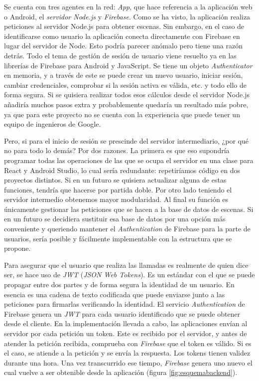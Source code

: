Se cuenta con tres agentes en la red: \textit{App}, que hace referencia a la aplicación web o Android, el \textit{servidor Node.js} y \textit{Firebase}. Como se ha visto, la aplicación realiza peticiones al servidor Node.js para obtener escenas. Sin embargo, en el caso de identificarse como usuario la aplicación conecta directamente con Firebase en lugar del servidor de Node. Esto podría parecer anómalo pero tiene una razón detrás. Todo el tema de gestión de sesión de usuario viene resuelto ya en las librerías de Firebase para Android y JavaScript. Se tiene un objeto \textit{Authenticator} en memoria, y a través de este se puede crear un nuevo usuario, iniciar sesión, cambiar credenciales, comprobar si la sesión activa es válida, etc. y todo ello de forma segura. Si se quisiera realizar todos esos cálculos desde el servidor Node.js añadiría muchos pasos extra y probablemente quedaría un resultado más pobre, ya que para este proyecto no se cuenta con la experiencia que puede tener un equipo de ingenieros de Google.

Pero, si para el inicio de sesión se prescinde del servidor intermediario, ¿por qué no para todo lo demás? Por dos razones. La primera es que eso supondría programar todas las operaciones de las que se ocupa el servidor en una clase para React y Android Studio, lo cual sería redundante: repetiríamos código en dos proyectos distintos. Si en un futuro se quisiera actualizar alguna de estas funciones, tendría que hacerse por partida doble. Por otro lado teniendo el servidor intermedio obtenemos mayor modularidad. Al final su función es únicamente gestionar las peticiones que se hacen a la base de datos de escenas. Si en un futuro se decidiera sustituir esa base de datos por una opción más conveniente y queriendo mantener el \textit{Authentication} de Firebase para la parte de usuarios, sería posible y fácilmente implementable con la estructura que se propone.

Para asegurar que el usuario que realiza las llamadas es realmente de quien dice ser, se hace uso de \textit{JWT} (\textit{JSON Web Tokens}). Es un estándar con el que se puede propagar entre dos partes y de forma segura la identidad de un usuario. En esencia es una cadena de texto codificada que puede enviarse junto a las peticiones para firmarlas verificando la identidad. El servicio \textit{Authentication} de Firebase genera un \textit{JWT} para cada usuario identificado que se puede obtener desde el cliente. En la implementación llevada a cabo, las aplicaciones envían al servidor por cada petición un token. Este es recibido por el servidor, y antes de atender la petición recibida, comprueba con \textit{Firebase} que el token es válido. Si es el caso, se atiende a la petición y se envía la respuesta. Los tokens tienen validez durante una hora. Una vez transcurrido ese tiempo, \textit{Firebase} genera uno nuevo el cual vuelve a ser obtenible desde la aplicación (figura \ref{fig:esquemabackend}).

